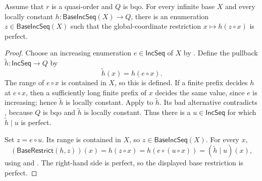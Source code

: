 \begin{lemma}
Assume that $r$ is a quasi-order and $Q$ is bqo.  For every infinite base
$X$ and every locally constant $h:\mathsf{BaseIncSeq}(X)\to Q$, there is
an enumeration $z\in\mathsf{BaseIncSeq}(X)$ such that the global-coordinate
restriction $x\mapsto h(z\circ x)$ is perfect.
\end{lemma}
\begin{proof}
Choose an increasing enumeration $e\in\mathsf{IncSeq}$ of $X$ by
.  Define the pullback
$\widetilde h:\mathsf{IncSeq}\to Q$ by
\[
\widetilde h(x)=h(e\circ x).
\]
The range of $e\circ x$ is contained in $X$, so this is defined.  If a
finite prefix decides $h$ at $e\circ x$, then a sufficiently long finite
prefix of $x$ decides the same value, since $e$ is increasing; hence
$\widetilde h$ is locally constant.  Apply  to
$\widetilde h$.  Its bad alternative contradicts , because
$Q$ is bqo and $\widetilde h$ is locally constant.  Thus there is a
$u\in\mathsf{IncSeq}$ for which $\widetilde h\mathbin{|}u$ is perfect.

Set $z=e\circ u$.  Its range is contained in $X$, so
$z\in\mathsf{BaseIncSeq}(X)$.  For every $x$,
\[
(\mathsf{BaseRestrict}(h,z))(x)=h(z\circ x)
=h(e\circ(u\circ x))
=(\widetilde h\mathbin{|}u)(x),
\]
using  and .  The
right-hand side is perfect, so the displayed base restriction is perfect.
\end{proof}
